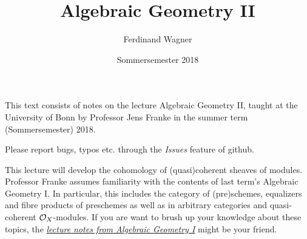 \documentclass[a4paper,parskip=half,numbers=enddot, DIV=12]{scrreprt}
\title{Algebraic Geometry II}
\author{Ferdinand Wagner}
\date{Sommersemester 2018}
\begin{document}
\maketitle
{}

\thispagestyle{plain}
This text consists of notes on the lecture Algebraic Geometry II, taught at the University of Bonn by Professor Jens Franke in the summer term (Sommersemester) 2018. 

Please report bugs, typos etc. through the \emph{Issues} feature of github.

\tableofcontents

This lecture will develop the cohomology of (quasi)coherent sheaves of modules. Professor Franke assumes familiarity with the contents of last term's Algebraic Geometry I. In particular, this includes the category of (pre)schemes, equalizers and fibre products of preschemes as well as in arbitrary categories and quasi-coherent $\mathcal{O}_X$-modules. If you are want to brush up your knowledge about these topics, the \href{https://github.com/Nicholas42/AlgebraFranke/tree/master/AlgGeoI}{\emph{lecture notes from Algebraic Geometry I}} \cite{alggeo1} might be your friend.
\end{document}
